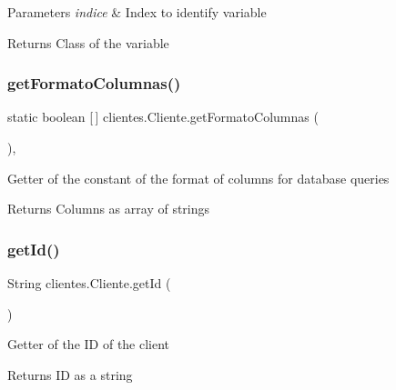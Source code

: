\begin{DoxyParams}{Parameters}
{\em indice} & Index to identify variable \\
\hline
\end{DoxyParams}
\begin{DoxyReturn}{Returns}
Class of the variable 
\end{DoxyReturn}
\mbox{\label{classclientes_1_1_cliente_a3e27faa4e105a87dad7a4dd3f01f2c4c}} 
\subsubsection{\texorpdfstring{get\+Formato\+Columnas()}{getFormatoColumnas()}}
{\footnotesize\ttfamily static boolean \mbox{[}$\,$\mbox{]} clientes.\+Cliente.\+get\+Formato\+Columnas (\begin{DoxyParamCaption}{ }\end{DoxyParamCaption})\hspace{0.3cm}{\ttfamily [inline]}, {\ttfamily [static]}}

Getter of the constant of the format of columns for database queries

\begin{DoxyReturn}{Returns}
Columns as array of strings 
\end{DoxyReturn}
\mbox{\label{classclientes_1_1_cliente_afbd9530580077a88e7b5f0522d56ee6f}} 
\subsubsection{\texorpdfstring{get\+Id()}{getId()}}
{\footnotesize\ttfamily String clientes.\+Cliente.\+get\+Id (\begin{DoxyParamCaption}{ }\end{DoxyParamCaption})\hspace{0.3cm}{\ttfamily [inline]}}

Getter of the ID of the client

\begin{DoxyReturn}{Returns}
ID as a string 
\end{DoxyReturn}
\mbox{\label{classclientes_1_1_cliente_ace7ec925e4e47251fb01d320b17c95eb}} 
